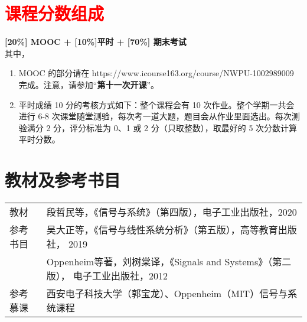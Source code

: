 \documentclass[letterpaper]{article}
\begin{document}

\section*{\textsc{\textcolor{red}{课程分数组成}}}
\textbf{[20\%] MOOC + [10\%]平时 +  [70\%] 期末考试} \vspace{.5em}\\
其中，
\begin{enumerate}
  \item MOOC 的部分请在 https://www.icourse163.org/course/NWPU-1002989009 完成。注意，请参加“\textbf{第十一次开课}”。
  \item 平时成绩 10 分的考核方式如下：整个课程会有 10 次作业。整个学期一共会进行 6-8 次课堂随堂测验，每次考一道大题，题目会从作业里面选出。每次测验满分 2 分，评分标准为 0、1 或 2 分（只取整数），取最好的 5 次分数计算平时分数。
\end{enumerate}

\section*{\textsc{教材及参考书目}}
\begin{tabular}{ll}
教材    & 段哲民等，《信号与系统》（第四版），电子工业出版社，2020 \vspace{.5em}\\
参考书目 & 吴大正等，《信号与线性系统分析》（第五版），高等教育出版社， 2019 \vspace{.5em} \\
& Oppenheim等著，刘树棠译，《Signals and Systems》（第二版）， 电子工业出版社，2012\vspace{.5em}\\
参考慕课 & 西安电子科技大学（郭宝龙）、Oppenheim（MIT）信号与系统课程
\end{tabular}

\end{document}

